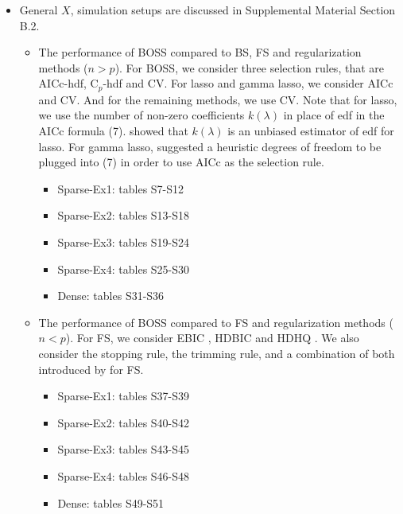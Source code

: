 \documentclass{article}
\begin{document}
\begin{itemize}
\begin{itemize}
	\end{itemize}
	\item General $X$, simulation setups are discussed in Supplemental Material Section B.2. 
	\begin{itemize}
		\item The performance of BOSS compared to BS, FS and regularization methods ($n>p$). For BOSS, we consider three selection rules, that are AICc-hdf, C$_p$-hdf and CV. For lasso and gamma lasso, we consider AICc and CV. And for the remaining methods, we use CV. Note that for lasso, we use the number of non-zero coefficients $k(\lambda)$ in place of edf in the AICc formula (7). \citet{Zou2007} showed that $k(\lambda)$ is an unbiased estimator of edf for lasso. For gamma lasso, \citet{Taddy2017} suggested a heuristic degrees of freedom to be plugged into (7) in order to use AICc as the selection rule.
		\begin{itemize}
			\item Sparse-Ex1: tables S7-S12
			\item Sparse-Ex2: tables S13-S18
			\item Sparse-Ex3: tables S19-S24
			\item Sparse-Ex4: tables S25-S30
			\item Dense: tables S31-S36
		\end{itemize}
		\item The performance of BOSS compared to FS and regularization methods ($n<p$). For FS, we consider EBIC \citep{wang2009forward}, HDBIC and HDHQ \citep{ing2011stepwise}. We also consider the stopping rule, the trimming rule, and a combination of both introduced by \citet{ing2011stepwise} for FS.
		\begin{itemize}
			\item Sparse-Ex1: tables S37-S39
			\item Sparse-Ex2: tables S40-S42
			\item Sparse-Ex3: tables S43-S45
			\item Sparse-Ex4: tables S46-S48
			\item Dense: tables S49-S51
		\end{itemize}
	\end{itemize}
\end{itemize}

\clearpage







\end{document}

